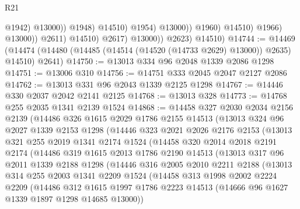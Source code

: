 \begin{lexlean}{R21}
\begin{coremodule}
                                            @1942)
                                          @13000))
                                      @1948)
                                    @14510)
                                  @1954)
                                @13000))
                            @1960)
                          @14510)
                        @1966)
                      @13000))
                  @2611)
                @14510)
              @2617)
            @13000))
        @2623)
      @14510)
@14744 := @14469
    (@14474 (@14480 (@14485 (@14514 (@14520 (@14733 @2629) @13000)) @2635) @14510) @2641)
@14750 := @13013 @334 @96 @2048 @1339 @2086 @1298
@14751 := @13006 @310
@14756 := @14751 @333 @2045 @2047 @2127 @2086
@14762 := @13013 @331 @96 @2043 @1339 @2125 @1298
@14767 := @14446 @330 @2037 @2042 @2141 @2125
@14768 := @13013 @328
@14773 := @14768 @255 @2035 @1341 @2139 @1524
@14868 := @14458
    @327
    @2030
    @2034
    @2156
    @2139
    (@14486
      @326
      @1615
      @2029
      @1786
      @2155
      @14513
      (@13013
        @324
        @96
        @2027
        @1339
        @2153
        @1298
        (@14446
          @323
          @2021
          @2026
          @2176
          @2153
          (@13013
            @321
            @255
            @2019
            @1341
            @2174
            @1524
            (@14458
              @320
              @2014
              @2018
              @2191
              @2174
              (@14486
                @319
                @1615
                @2013
                @1786
                @2190
                @14513
                (@13013
                  @317
                  @96
                  @2011
                  @1339
                  @2188
                  @1298
                  (@14446
                    @316
                    @2005
                    @2010
                    @2211
                    @2188
                    (@13013
                      @314
                      @255
                      @2003
                      @1341
                      @2209
                      @1524
                      (@14458
                        @313
                        @1998
                        @2002
                        @2224
                        @2209
                        (@14486
                          @312
                          @1615
                          @1997
                          @1786
                          @2223
                          @14513
                          (@14666 @96 @1627 @1339 @1897 @1298 @14685 @13000))

\end{coremodule}
\end{lexlean}
